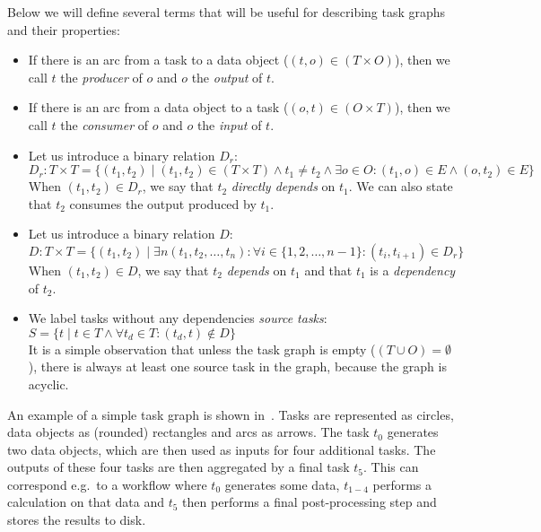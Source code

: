 \vspace{2mm}Below we will define several terms that will be useful for describing task
graphs and their
properties:
\begin{itemize}
	\item If there is an arc from a task to a data object ($(t,o) \in (T\times{}O)$), then we call
	      $t$ the \emph{producer} of $o$ and
	      $o$ the \emph{output} of $t$.
	\item If there is an arc from a data object to a task ($(o,t) \in (O\times{}T)$), then we call
	      $t$ the \emph{consumer} of $o$ and
	      $o$ the \emph{input} of $t$.

	\item Let us introduce a binary relation $D_r$: \\ $D_r: T \times T = \{(t_1, t_2) \mid (t_1, t_2)\in{}(T\times{}T)\land t_1 \neq t_2 \land
		      \exists{}o\in{}O\colon (t_1, o)\in{}E
		      \land (o, t_2)\in{}E\}$ \\ When
	      $(t_1, t_2) \in D_r$, we say that $t_2$ \emph{directly depends} on
	      $t_1$. We can also state that $t_2$ consumes the output produced
	      by $t_1$.

	\item Let us introduce a binary relation $D$: \\ $D: T \times T = \{(t_1, t_2) \mid \exists{}n (t_1, t_2, \ldots, t_n)\colon \forall i
		      \in \{1,2,\ldots,n - 1\}\colon (t_i, t_{i+1}) \in{} D_r\}$ \\ When
	      $(t_1, t_2) \in D$, we say that $t_2$ \emph{depends} on
	      $t_1$ and that $t_1$ is a \emph{dependency} of
	      $t_2$.

	\item We label tasks without any dependencies \emph{source tasks}: \\ $S = \{ t \mid t\in{}T \land
		      \forall{}t_d\in{}T\colon (t_d, t)\notin D\}$ \\ It is
	      a simple observation that unless the task graph is empty ($(T\cup{}O) = \emptyset$), there is always
	      at least one source task in the graph, because the graph is acyclic.
\end{itemize}


An example of a simple task graph is shown in~. Tasks are represented as
circles, data objects as (rounded) rectangles and arcs as arrows. The task $t_0$
generates two data objects, which are then used as inputs for four additional tasks. The outputs of
these four tasks are then aggregated by a final task $t_5$. This can correspond
e.g.\ to a workflow where $t_0$ generates some data, $t_{1-4}$
performs a calculation on that data and $t_5$ then performs a final
post-processing step and stores the results to disk.

